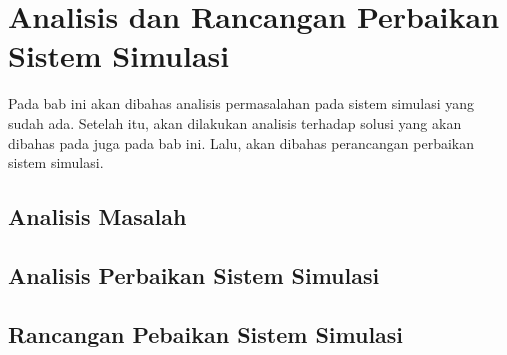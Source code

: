 \chapter{Analisis dan Rancangan Perbaikan Sistem Simulasi}

Pada bab ini akan dibahas analisis permasalahan pada sistem simulasi yang sudah
ada. Setelah itu, akan dilakukan analisis terhadap solusi yang akan dibahas pada
juga pada bab ini. Lalu, akan dibahas perancangan perbaikan sistem simulasi.

\section{Analisis Masalah}

\blindtext

\section{Analisis Perbaikan Sistem Simulasi}

\blindtext

\section{Rancangan Pebaikan Sistem Simulasi}

\blindtext